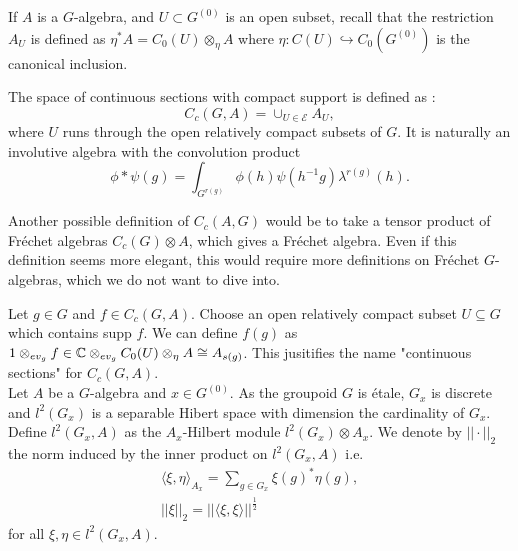 If $A$ is a $G$-algebra, and $U \subset G^{(0)}$ is an open subset, recall \cite{LeGall} that the restriction $A_U$ is defined as $\eta^* A = C_0(U) \otimes_\eta A$ where $\eta : C(U) \hookrightarrow C_0(G^{(0)})$ is the canonical inclusion. 

The space of continuous sections with compact support is defined as :
\[C_c(G,A) = \cup_{U\in \mathcal E} A_U,\]
where $U$ runs through the open relatively compact subsets of $G$. It is naturally an involutive algebra with the convolution product
\[\phi\ast \psi (g) = \int_{G^{r(g)}} \phi(h)\psi(h^{-1}g)\lambda^{r(g)}(h).\] 

\begin{rk}
Another possible definition of $C_c(A,G)$ would be to take a tensor product of Fréchet algebras $C_c(G)\otimes A$, which gives a Fréchet algebra. Even if this definition seems more elegant, this would require more definitions on Fréchet $G$-algebras, which we do not want to dive into.  
\end{rk}



Let $g\in G$ and $f\in C_c(G,A)$. Choose an open relatively compact subset $U\subseteq G$ which contains supp $f$. We can define $f(g)$ as $1\otimes_{ev_g} f \in \mathbb C \otimes_{ev_g} C_0(U)\otimes_\eta A\cong A_{s(g)}$. This jusitifies the name "continuous sections" for $C_c(G,A)$. \\

Let $A$ be a $G$-algebra and $x\in G^{(0)}$. As the groupoid $G$ is étale, $G_x$ is discrete and $l^2(G_x)$ is a separable Hibert space with dimension the cardinality of $G_x$. Define $l^2(G_x,A)$ as the $A_x$-Hilbert module $l^2(G_x)\otimes A_x$. We denote by $||\cdot||_2$ the norm induced by the inner product on $l^2(G_x,A)$ i.e. 
\[ \begin{array}{c}
\langle \xi,\eta\rangle_{A_x}= \sum_{g\in G_x} \xi(g)^* \eta(g),\\
||\xi||_2= ||\langle \xi,\xi \rangle||^\frac{1}{2} 
\end{array}\] 
for all $\xi,\eta\in l^2(G_x,A)$.\\

